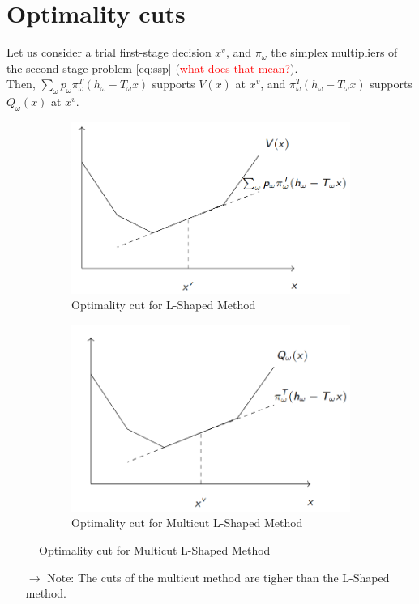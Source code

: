 \documentclass[12pt, openany]{report}
\theoremstyle{definition}
\begin{document}
\section{Optimality cuts}
Let us consider a trial first-stage decision $x^v$, and $\pi_\omega$ the simplex multipliers of the second-stage problem \eqref{eq:ssp} (\textcolor{red}{what does that mean?}).\\
Then, $\sum_\omega p_\omega \pi_\omega^T(h_\omega - T_\omega x)$ supports $V(x)$ at $x^v$, and $\pi_\omega^T(h_\omega - T_\omega x)$ supports $Q_\omega(x)$ at $x^v$.\\
\begin{figure}
	\centering
	\begin{subfigure}[b]{0.49\textwidth}
		\centering
		\includegraphics[width=\textwidth]{img/lshaped.png}
		\caption{Optimality cut for L-Shaped Method}
	\end{subfigure}
	\hfill 
	\begin{subfigure}[b]{0.49\textwidth}
		\centering
		\includegraphics[width=\textwidth]{img/multicut.png}
		\caption{Optimality cut for Multicut L-Shaped Method}
	\end{subfigure}
\end{figure}
\begin{itemize}
	\item [$\to$] Note: The cuts of the multicut method are tigher than the L-Shaped method.
\end{itemize}
\end{document}
